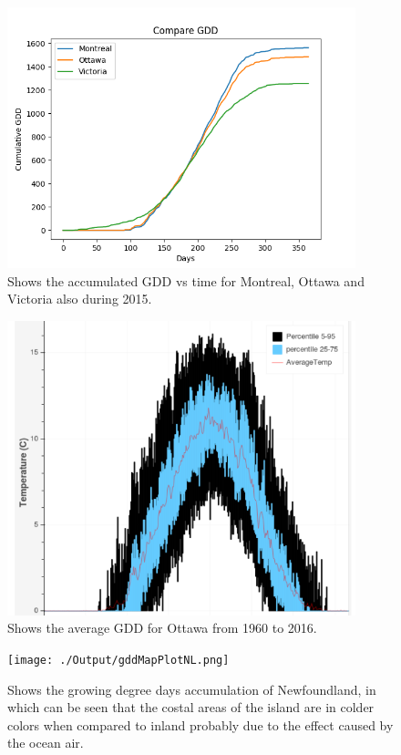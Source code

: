 \documentclass[12pt]{article}
\begin{document}
	\begin{figure}[!htbp]
		\centering
		\includegraphics[width=0.9\textwidth]{./Output/CumulativeGDD.png} 
		\caption{\scriptsize Shows the accumulated GDD vs time for Montreal, Ottawa and Victoria also
		during 2015.}\label{GDDplot}		  
	\end{figure}

	\begin{figure}[!htbp]
		\centering
		\includegraphics[width=0.9\textwidth]{./Report/GDDstats.png} 
		\caption{\scriptsize Shows the average GDD for Ottawa from 1960 to 2016.}\label{GDDstats}		  
	\end{figure}


	\begin{figure}[!htbp]
		\centering
		\texttt{[image: ./Output/gddMapPlotNL.png]} 
		\caption{\scriptsize Shows the growing degree days accumulation of Newfoundland, 
		in which can be seen that the costal areas of the island are in colder colors when compared to
		inland probably due to the effect caused by the ocean air.
		}\label{gddMapNl}		  
	\end{figure}
\end{document}
